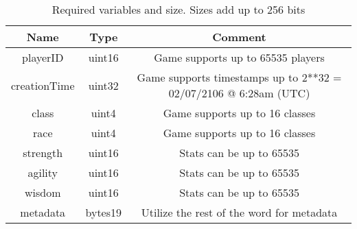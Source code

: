 \begin{table}[H]
	\centering
	\vspace*{-1ex}
	\scriptsize
	\caption{Required variables and size. Sizes add up to 256 bits}
	\vspace{-1ex}
    \label{table:characteristics}
	\begin{tabular}{|c|c|c|}
        \hline
        \textbf{Name} & \textbf{Type}  & \textbf{Comment}\\ \hline 
        playerID      & uint16         & Game supports up to 65535 players\\
        creationTime  & uint32         & Game supports timestamps up to 2**32 = 02/07/2106 @ 6:28am (UTC) \\
        class         & uint4          & Game supports up to 16 classes \\
        race          & uint4          & Game supports up to 16 classes \\
        strength      & uint16         & Stats can be up to 65535\\
        agility       & uint16         & Stats can be up to 65535 \\
        wisdom        & uint16         & Stats can be up to 65535 \\
        metadata      & bytes19        & Utilize the rest of the word for metadata \\
        \hline
    \end{tabular}
\end{table}